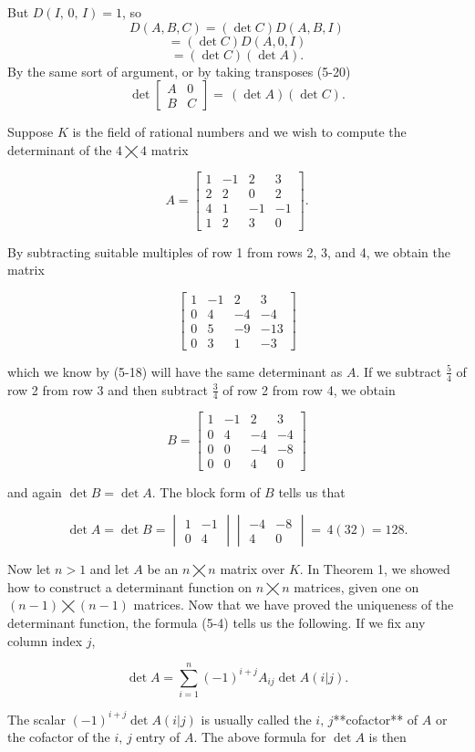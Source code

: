 But \(D(I,\,0,\,I)=1\), so \[D(A,B,C) = (\det C)D(A,B,I)\] \[= (\det C)D(A,0,I)\] \[= (\det C)(\det A).\] By the same sort of argument, or by taking transposes (5-20) \[\det\begin{bmatrix}A&0\\ B&C\end{bmatrix}=\,(\det A)(\det C).\]

Suppose \(K\) is the field of rational numbers and we wish to compute the determinant of the \(4\bigtimes 4\) matrix

\[A=\begin{bmatrix}1&-1&2&3\\ 2&2&0&2\\ 4&1&-1&-1\\ 1&2&3&0\end{bmatrix}.\]

By subtracting suitable multiples of row 1 from rows 2, 3, and 4, we obtain the matrix

\[\begin{bmatrix}1&-1&2&3\\ 0&4&-4&-4\\ 0&5&-9&-13\\ 0&3&1&-3\end{bmatrix}\]

which we know by (5-18) will have the same determinant as \(A\). If we subtract \(\frac{5}{4}\) of row 2 from row 3 and then subtract \(\frac{3}{4}\) of row 2 from row 4, we obtain

\[B=\begin{bmatrix}1&-1&2&3\\ 0&4&-4&-4\\ 0&0&-4&-8\\ 0&0&4&0\end{bmatrix}\]

and again \(\det B=\det A\). The block form of \(B\) tells us that

\[\det A=\det B=\begin{vmatrix}1&-1\\ 0&4\end{vmatrix}\begin{vmatrix}-4&-8\\ 4&0\end{vmatrix}=\,4(32)=128.\]

Now let \(n>1\) and let \(A\) be an \(n\bigtimes n\) matrix over \(K\). In Theorem 1, we showed how to construct a determinant function on \(n\bigtimes n\) matrices, given one on \((n-1)\bigtimes(n-1)\) matrices. Now that we have proved the uniqueness of the determinant function, the formula (5-4) tells us the following. If we fix any column index \(j\),

\[\det A=\sum\limits_{i=1}^{n}(-1)^{i+j}A_{ij}\det A(i|j).\]

The scalar \((-1)^{i+j}\det A(i|j)\) is usually called the \(i,\,j\)**cofactor** of \(A\) or the cofactor of the \(i,\,j\) entry of \(A\). The above formula for \(\det A\) is then 